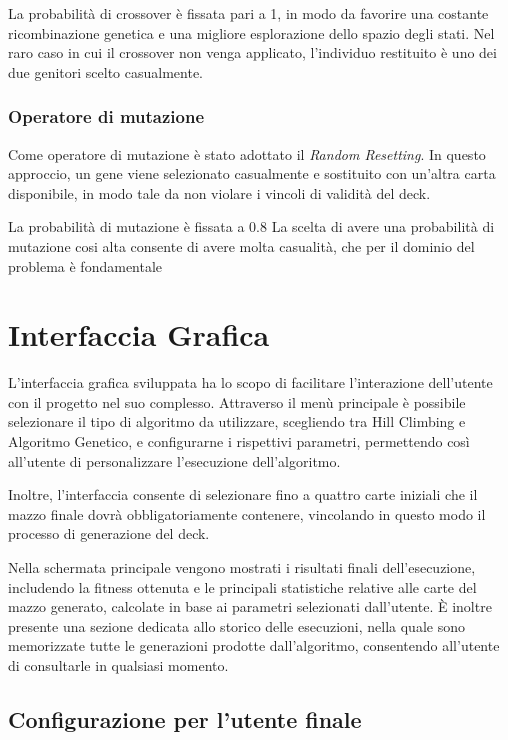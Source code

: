 \documentclass{article}
\begin{document}
La probabilità di crossover è fissata pari a 1, in modo da favorire una costante ricombinazione genetica e una migliore esplorazione dello spazio degli stati. 
Nel raro caso in cui il crossover non venga applicato, l’individuo restituito è uno dei due genitori scelto casualmente.

\subsubsection{Operatore di mutazione}

Come operatore di mutazione è stato adottato il \textit{Random Resetting}. 
In questo approccio, un gene viene selezionato casualmente e sostituito con un’altra carta disponibile, in modo tale da non violare i vincoli di validità del deck.

La probabilità di mutazione è fissata a 0.8
La scelta di avere una probabilità di mutazione cosi alta consente di avere molta casualità, che per il dominio del problema è fondamentale 

\section{Interfaccia Grafica}

L’interfaccia grafica sviluppata ha lo scopo di facilitare l’interazione dell’utente con il progetto nel suo complesso.  
Attraverso il menù principale è possibile selezionare il tipo di algoritmo da utilizzare, scegliendo tra Hill Climbing e Algoritmo Genetico, e configurarne i rispettivi parametri, permettendo così all’utente di personalizzare l’esecuzione dell’algoritmo.

Inoltre, l’interfaccia consente di selezionare fino a quattro carte iniziali che il mazzo finale dovrà obbligatoriamente contenere, vincolando in questo modo il processo di generazione del deck.

Nella schermata principale vengono mostrati i risultati finali dell’esecuzione, includendo la fitness ottenuta e le principali statistiche relative alle carte del mazzo generato, calcolate in base ai parametri selezionati dall’utente.  
È inoltre presente una sezione dedicata allo storico delle esecuzioni, nella quale sono memorizzate tutte le generazioni prodotte dall’algoritmo, consentendo all’utente di consultarle in qualsiasi momento.

\subsection{Configurazione per l’utente finale}
\end{document}
